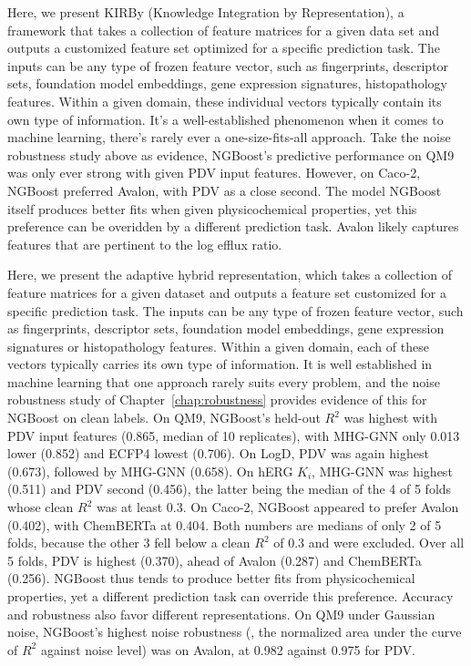Here, we present KIRBy (Knowledge Integration by Representation), a framework that takes a collection of feature matrices for a given data set and outputs a customized feature set optimized for a specific prediction task. The inputs can be any type of frozen feature vector, such as fingerprints, descriptor sets, foundation model embeddings, gene expression signatures, histopathology features. Within a given domain, these individual vectors typically contain its own type of information. It's a well-established phenomenon when it comes to machine learning, there's rarely ever a one-size-fits-all approach. Take the noise robustness study above as evidence, NGBoost's predictive performance on QM9 was only ever strong with given PDV input features. However, on Caco-2, NGBoost preferred Avalon, with PDV as a close second. The model NGBoost itself produces better fits when given physicochemical properties, yet this preference can be overidden by a different prediction task. Avalon likely captures features that are pertinent to the log efflux ratio.

Here, we present the adaptive hybrid representation, which takes a collection of feature matrices for a given dataset and outputs a feature set customized for a specific prediction task. The inputs can be any type of frozen feature vector, such as fingerprints, descriptor sets, foundation model embeddings, gene expression signatures or histopathology features. Within a given domain, each of these vectors typically carries its own type of information. It is well established in machine learning that one approach rarely suits every problem, and the noise robustness study of Chapter~\ref{chap:robustness} provides evidence of this for NGBoost on clean labels. On QM9, NGBoost's held-out $R^2$ was highest with PDV input features (0.865, median of 10 replicates), with MHG-GNN only 0.013 lower (0.852) and ECFP4 lowest (0.706). On LogD, PDV was again highest (0.673), followed by MHG-GNN (0.658). On hERG $K_i$, MHG-GNN was highest (0.511) and PDV second (0.456), the latter being the median of the 4 of 5 folds whose clean $R^2$ was at least 0.3. On Caco-2, NGBoost appeared to prefer Avalon (0.402), with ChemBERTa at 0.404. Both numbers are medians of only 2 of 5 folds, because the other 3 fell below a clean $R^2$ of 0.3 and were excluded. Over all 5 folds, PDV is highest (0.370), ahead of Avalon (0.287) and ChemBERTa (0.256). NGBoost thus tends to produce better fits from physicochemical properties, yet a different prediction task can override this preference. Accuracy and robustness also favor different representations. On QM9 under Gaussian noise, NGBoost's highest noise robustness (\aucnorm, the normalized area under the curve of $R^2$ against noise level) was on Avalon, at 0.982 against 0.975 for PDV.

